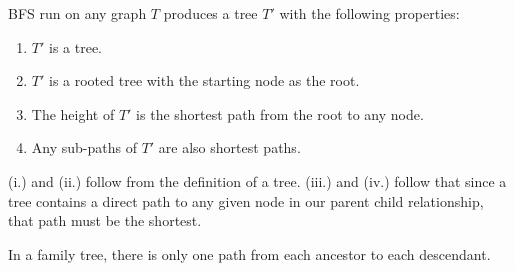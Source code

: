 \begin{theo}
    
    BFS run on any graph $T$ produces a tree $T'$ with the following properties:
    \begin{enumerate}
        \item [(i.)] $T'$ is a tree.
        \item [(ii.)] $T'$ is a rooted tree with the starting node as the root.
        \item [(iii.)] The height of $T'$ is the shortest path from the root to any node.
        \item [(iv.)] Any sub-paths of $T'$ are also shortest paths.
    \end{enumerate}
\end{theo}
\begin{Proof}

    (i.) and (ii.) follow from the definition of a tree. (iii.) and (iv.) follow that since a tree 
    contains a direct path to any given node in our parent child relationship, that path must be the shortest.
\end{Proof}
\begin{Tip}
    In a family tree, there is only one path from each ancestor to each descendant.
\end{Tip}

\newpage 

